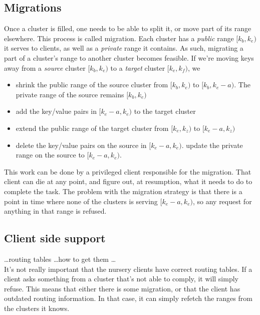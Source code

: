 \subsection{Migrations}
Once a cluster is filled, one needs to be able to split it, or move part of its range elsewhere. This process is called migration.
Each cluster has a \emph{public} range $[k_b,k_e)$ it serves to clients, as well as a \emph{private} range it contains. 
As such, migrating a part of a cluster's range to another cluster becomes feasible. 
If we're moving keys away from a \emph{source} cluster $[k_b,k_e)$ 
to a \emph{target} cluster $[k_e,k_f)$, we
\begin{itemize}
\item{} shrink the public range of the source cluster from 
$[k_b,k_e)$ to $[k_b, k_e - a)$. 
The private range of the source remains $[k_b,k_e)$
\item{} add the key/value pairs in $[k_e - a,k_e)$ to the target cluster
\item{} extend the public range of the target cluster from
$[k_e,k_z)$ to $[k_e - a, k_z)$
\item{} delete the key/value pairs on the source in $[k_e -a,k_e)$.
        update the private range on the source to $[k_e - a, k_e)$.
\end{itemize}
This work can be done by a privileged client responsible for the migration. 
That client can die at any point, and figure out, at resumption, what it needs to do to complete the task. 
The problem with the migration strategy is that there is a point in time where none of the clusters is serving $[k_e -a, k_e)$, so any request for anything in that range is refused.

\subsection{Client side support}
\ldots routing tables \ldots how to get them \ldots \\
It's not really important that the nursery clients have correct routing tables. 
If a client asks something from a cluster that's not able to comply, it will simply refuse. This means that either there is some migration, or that the client has outdated routing information. In that case, it can simply refetch the ranges from the clusters it knows.


